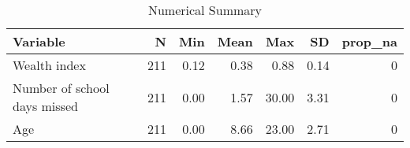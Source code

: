 \begin{table}[!t]
\caption*{
{\large Numerical Summary}
} 
\fontsize{12.0pt}{14.4pt}\selectfont
\begin{tabular*}{\linewidth}{@{\extracolsep{\fill}}lrrrrrr}
\toprule
Variable & N & Min & Mean & Max & SD & prop\_na \\ 
\midrule\addlinespace[2.5pt]
Wealth index & 211 & 0.12 & 0.38 & 0.88 & 0.14 & 0 \\ 
Number of school days missed & 211 & 0.00 & 1.57 & 30.00 & 3.31 & 0 \\ 
Age & 211 & 0.00 & 8.66 & 23.00 & 2.71 & 0 \\ 
\bottomrule
\end{tabular*}
\end{table}

